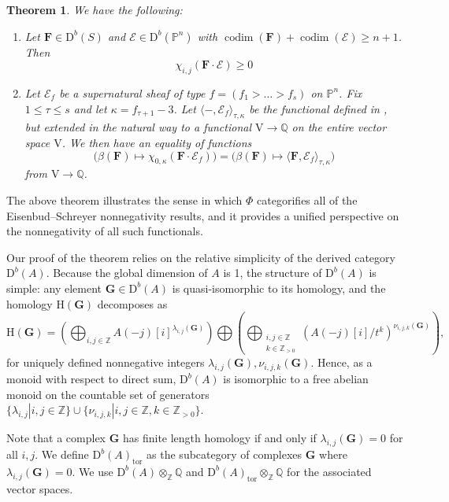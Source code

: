 \documentclass[12pt]{amsart}
\newtheorem{thm}[lemma]{Theorem}
\theoremstyle{definition}
\theoremstyle{remark}
\newcommand{\codim}{\operatorname{codim}}
\newcommand{\PP}{\mathbb{P}}
\newcommand{\HH}{\mathrm{H}}
\newcommand{\ZZ}{\mathbb{Z}}
\newcommand{\QQ}{\mathbb{Q}}
\newcommand{\VV}{\mathrm{V}}
\newcommand{\cE}{\mathcal{E}}
\newcommand{\FF}{\mathbf{F}}
\newcommand{\Gbull}{\mathbf{G}}
\newcommand{\DD}{\mathrm{D}}
\begin{document}
\begin{thm}\label{thm:categorified}
We have the following:
\begin{enumerate}
	\item  Let $\FF\in \DD^b(S)$ and $\cE\in \DD^b(\PP^n)$ with $\codim(\FF)+\codim(\cE)\geq n+1$.  Then
\[
\chi_{i,j}(\FF\cdot \cE)\geq 0
\]
	\item  Let $\cE_{f}$ be a supernatural sheaf of type $f=(f_1>\dots>f_s)$ on $\PP^n$.  Fix $1\leq \tau \leq s$ and let $\kappa=f_{\tau+1}-3$.  Let $\langle -, \cE_{f}\rangle_{\tau,\kappa}$ be the functional defined in \cite{eis-schrey-icm}, but extended in the natural way to a functional $\VV\to \QQ$ on the entire vector space $\VV$.  We then have an equality of functions
\[
\bigg( \beta(\FF)\mapsto \chi_{0,\kappa}(\FF\cdot \cE_f)\bigg) =\bigg( \beta(\FF)\mapsto \langle \FF, \cE_f\rangle_{\tau,\kappa} \bigg)\]
from $\VV \to \QQ$.
\end{enumerate}
\end{thm}
The above theorem illustrates the sense in which $\Phi$ categorifies all of the Eisenbud--Schreyer nonnegativity results, and it provides a unified perspective on the nonnegativity of all such functionals.  



Our proof of the theorem relies on the relative simplicity of the derived category $\DD^b(A)$.  Because the global dimension of $A$ is 1, the structure of $\DD^b(A)$ is simple: any element $\Gbull\in \DD^b(A)$ is quasi-isomorphic to its homology, and the homology $\HH(\Gbull)$ decomposes as
\begin{equation}\label{eqn:splitting}
\HH(\Gbull)=\left( \bigoplus_{i,j\in \ZZ} A(-j)[i]^{\lambda_{i,j}(\Gbull)}\right) \bigoplus \left( \bigoplus_{\substack{i,j\in \ZZ\\ k\in \ZZ_{>0}}} (A(-j)[i]/t^k)^{\nu_{i,j,k}(\Gbull)}\right),
\end{equation}
for uniquely defined nonnegative integers $\lambda_{i,j}(\Gbull), \nu_{i,j,k}(\Gbull)$.  Hence, as a monoid with respect to direct sum, $\DD^b(A)$ is isomorphic to a free abelian monoid on the countable set of generators $\{\lambda_{i,j} | i,j\in \ZZ\} \cup \{ \nu_{i,j,k}  | i,j\in \ZZ, k\in \ZZ_{>0}\}$. 

Note that a complex $\Gbull$ has finite length homology if and only if $\lambda_{i,j}(\Gbull)=0$ for all $i,j$.  We  define $\DD^b(A)_{\text{tor}}$ as the subcategory of complexes $\Gbull$ where $\lambda_{i,j}(\Gbull)=0$.  We use $\DD^b(A)\otimes_{\ZZ} \QQ$ and $\DD^b(A)_{\text{tor}}\otimes_{\ZZ} \QQ$ for the associated vector spaces.
\end{document}
